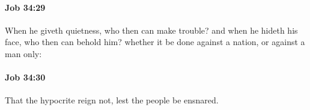 		\paragraph{Job 34:29} %
			\label{JOB-34-29}

			When he giveth quietness, who then can make trouble? and when he hideth his face, who then can behold him? whether it be done against a nation, or against a man only:


		\paragraph{Job 34:30} %
			\label{JOB-34-30}

			That the hypocrite reign not, lest the people be ensnared.


